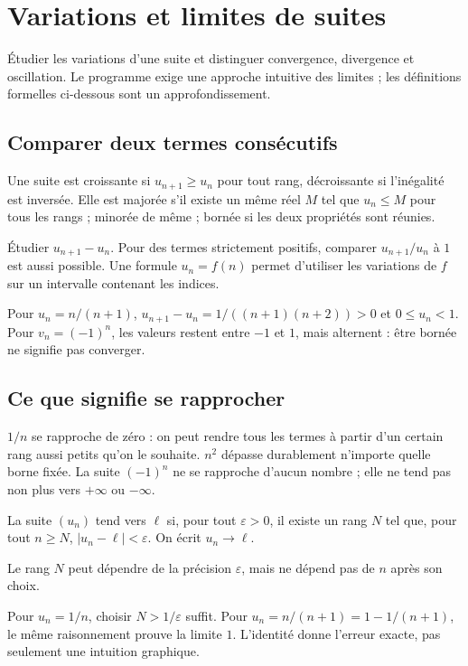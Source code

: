 \documentclass[../cours_1re.tex]{subfiles}
\begin{document}
\setcounter{chapter}{6}
\chapter{Variations et limites de suites}
\label{ch:07}
\begin{objectif}
Étudier les variations d'une suite et distinguer convergence, divergence et oscillation. Le programme exige une approche intuitive des limites ; les définitions formelles ci-dessous sont un approfondissement.
\end{objectif}
\section{Comparer deux termes consécutifs}
Une suite est croissante si $u_{n+1}\ge u_n$ pour tout rang, décroissante si l'inégalité est inversée. Elle est majorée s'il existe un même réel $M$ tel que $u_n\le M$ pour tous les rangs ; minorée de même ; bornée si les deux propriétés sont réunies.
\begin{methode}
Étudier $u_{n+1}-u_n$. Pour des termes strictement positifs, comparer $u_{n+1}/u_n$ à $1$ est aussi possible. Une formule $u_n=f(n)$ permet d'utiliser les variations de $f$ sur un intervalle contenant les indices.
\end{methode}
\begin{exemple}
Pour $u_n=n/(n+1)$,
$u_{n+1}-u_n=1/((n+1)(n+2))>0$ et $0\le u_n<1$.
Pour $v_n=(-1)^n$, les valeurs restent entre $-1$ et $1$, mais alternent : être bornée ne signifie pas converger.
\end{exemple}
\section{Ce que signifie se rapprocher}
$1/n$ se rapproche de zéro : on peut rendre tous les termes à partir d'un certain rang aussi petits qu'on le souhaite.
$n^2$ dépasse durablement n'importe quelle borne fixée.
La suite $(-1)^n$ ne se rapproche d'aucun nombre ; elle ne tend pas non plus vers $+\infty$ ou $-\infty$.
\begin{definition}
La suite $(u_n)$ tend vers $\ell$ si, pour tout $\varepsilon>0$, il existe un rang $N$ tel que, pour tout $n\ge N$, $|u_n-\ell|<\varepsilon$.
On écrit $u_n\to\ell$.
\end{definition}
Le rang $N$ peut dépendre de la précision $\varepsilon$, mais ne dépend pas de $n$ après son choix.
\begin{demonstration}
Pour $u_n=1/n$, choisir $N>1/\varepsilon$ suffit.
Pour $u_n=n/(n+1)=1-1/(n+1)$, le même raisonnement prouve la limite $1$. L'identité donne l'erreur exacte, pas seulement une intuition graphique.
\end{demonstration}
\end{document}
